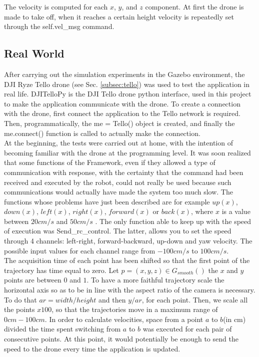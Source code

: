 \noindent The velocity is computed for each $x$, $y$, and $z$ component. At first the drone is made to take off, when it reaches a certain height velocity is repeatedly set through the self.vel\_msg command.

\subsection{Real World}
\label{sec:realworld}
After carrying out the simulation experiments in the Gazebo environment, the DJI Ryze Tello drone (see Sec. \ref{subsec:tello}) was used to test the application in real life. DJITelloPy is the DJI Tello drone python interface, used in this project to make the application communicate with the drone. To create a connection with the drone, first connect the application to the Tello network is required. Then, programmatically, the me = Tello() object is created, and finally the me.connect() function is called to actually make the connection. \\

\noindent At the beginning, the tests were carried out at home, with the intention of becoming familiar with the drone at the programming level. It was soon realized that some functions of the Framework, even if they allowed a type of communication with response, with the certainty that the command had been received and executed by the robot, could not really be used because such communications would actually have made the system too much slow. The functions whose problems have just been described are for example $up(x)$, $down(x)$, $left(x)$, $right(x)$, $forward(x)$ or $back(x)$, where $x$ is a value between $20cm/s$ and $50cm/s$ \cite[]{djitelloguide}. The only function able to keep up with the speed of execution was Send\_rc\_control. The latter, allows you to set the speed through 4 channels: left-right, forward-backward, up-down and yaw velocity. The possible input values for each channel range from $-100cm/s$ to $100cm/s$. \\

\noindent The acquisition time of each point has been shifted so that the first point of the trajectory has time equal to zero. Let $p=(x,y,z) \in G_{smooth}()$ the $x$ and $y$ points are between $0$ and $1$. To have a more faithful trajectory scale the horizontal axis so as to be in line with the aspect ratio of the camera is necessary. To do that $ar=width/height$ and then $y/ar$, for each point. Then, we scale all the points $x100$, so that the trajectories move in a maximum range of $0cm-100cm$. In order to calculate velocities, space from a point $a$ to $b$(in cm) divided the time spent switching from $a$ to $b$ was executed for each pair of consecutive points. At this point, it would potentially be enough to send the speed to the drone every time the application is updated. 

